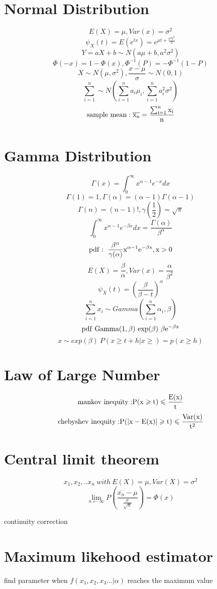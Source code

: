 \documentclass[12pt, a4paper, twocolumn]{article}
\begin{document}
\section*{Normal Distribution}

$$E(X) = \mu, Var(x) = \sigma^2$$
$$\psi_X(t) = E(e^{tx}) = e^{\mu t + \frac{\sigma^2t^2}{2}}$$
$$Y = aX + b \sim N(a\mu + b, a^2\sigma^2)$$
$$\Phi(-x) = 1 - \Phi(x), \Phi^{-1}(P) = -\Phi^{-1}(1 - P)$$
$$X \sim N(\mu, \sigma^2), \frac{x - \mu}{\sigma} \sim N(0, 1)$$
$$\sum_{i = 1}^n \sim N(\sum_{i = 1}^n a_i\mu_i, \sum_{i = 1}^n a_i^2\sigma^2)$$
$$\rm{sample\ mean: \overline{x_n} = \frac{\sum_{i = 1}^nx_i}{n}}$$
$$$$

\section*{Gamma Distribution}
$$\Gamma(x) = \int_0^{\infty}x^{\alpha - 1}e^{-x}dx$$
$$\Gamma(1) = 1, \Gamma(\alpha) = (\alpha - 1)\Gamma(\alpha - 1)$$
$$\Gamma(n) = (n - 1)!, \gamma(\frac{1}{2}) = \sqrt{\pi}$$
$$\int_0^{\infty}x^{\alpha - 1}e^{-\beta x}dx = \frac{\Gamma(\alpha)}{\beta^\alpha}$$
$$\rm{pdf}:\ \frac{\beta^\alpha}{\gamma(\alpha)}x^{\alpha - 1}e^{-\beta x}, x > 0$$
$$E(X) = \frac{\beta}{\alpha}, Var(x) = \frac{\alpha}{\beta^2}$$
$$\psi_X(t) = (\frac{\beta}{\beta - t})^{\alpha}$$
$$\sum_{i = 1}^n x_i \sim Gamma(\sum_{i = 1}^n \alpha_i, \beta)$$
$$\rm{pdf\ } Gamma(1, \beta)\ exp(\beta) \ \beta e^{-\beta x}$$
$$x \sim exp(\beta)\ P(x \geqslant t + h | x \geqslant) = p(x \geqslant h)$$

\section*{Law of Large Number}
$$\rm{mankov\ inequity: } P(x \geqslant t) \leqslant \frac{E(x)}{t}$$
$$\rm{chebyshev\ inequity:} P(|x - E(x)| \geqslant t) \leqslant \frac{Var(x)}{t^2}$$

\section*{Central limit theorem}

$$x_1, x_2, .. x_n \ with \ E(X) = \mu, Var(X) = \sigma^2$$
$$\lim_{n\leftarrow \infty}P(\frac{\overline{x_n} - \mu}{\frac{\sigma}{\sqrt{n}}}) = \Phi(x)$$

continuity correction

\section*{Maximum likehood estimator}
find parameter when $f(x_1, x_2, x_3 ... | \alpha)$ reaches the maximum value
\end{document}

